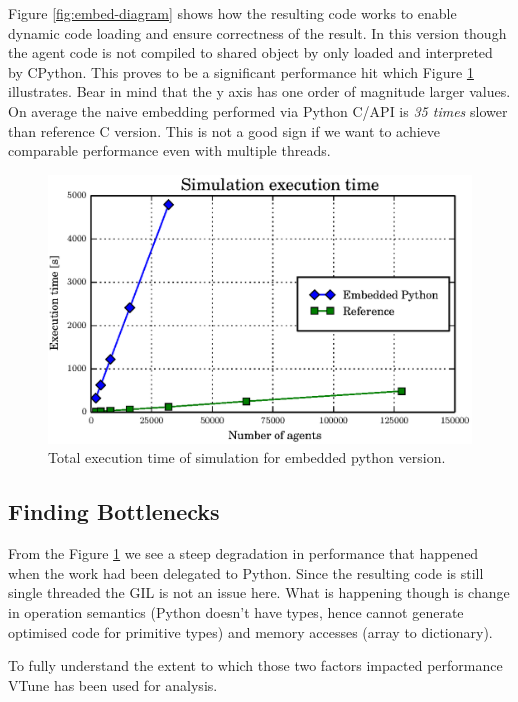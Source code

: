\documentclass[12pt, a4paper]{report}
\begin{document}
Figure \ref{fig:embed-diagram} shows how the resulting code works to enable dynamic
code loading and ensure correctness of the result. In this version though the
agent code is not compiled to shared object by only loaded and interpreted by CPython.
This proves to be a significant performance hit which Figure \ref{fig:cython-perf} illustrates.
Bear in mind that the y axis has one order of magnitude larger values. On average the
naive embedding performed via Python C/API is \emph{35 times} slower than reference
C version. This is not a good sign if we want to achieve comparable performance even
with multiple threads.

\begin{figure}[H]
  \begin{center}
    \includegraphics[width=\columnwidth]{graphs/cython-perf.eps}
    \caption{Total execution time of simulation for embedded python version.}
    \label{fig:cython-perf}
  \end{center}
\end{figure}

\subsection{Finding Bottlenecks}\label{subsec:python-embed-bottleneck}
From the Figure \ref{fig:cython-perf} we see a steep
degradation in performance that happened when the work had been delegated
to Python. Since the resulting code is still single threaded the GIL is
not an issue here. What is happening though is change in operation semantics
(Python doesn't have types, hence cannot generate optimised code for primitive types)
and memory accesses (array to dictionary).

To fully understand the extent to which those two factors impacted performance
VTune has been used for analysis.
\end{document}
